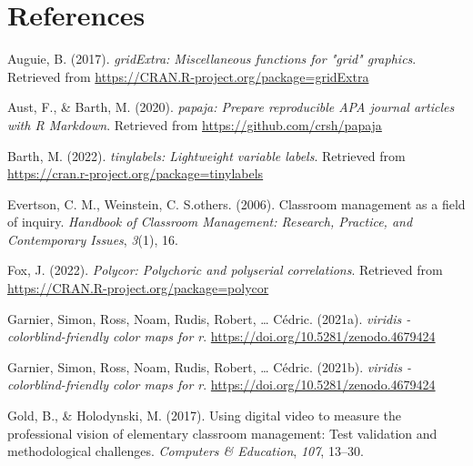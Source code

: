 \documentclass[
  man,floatsintext]{apa6}
\newlength{\cslhangindent}
\newlength{\cslentryspacingunit} %
\newenvironment{CSLReferences}[2] %
 {%
  \setlength{\parindent}{0pt}
  \ifodd #1
  \let\oldpar\par
  \def\par{\hangindent=\cslhangindent\oldpar}
  \fi
  \setlength{\parskip}{#2\cslentryspacingunit}
 }%
 {}
\begin{document}
\newpage

\hypertarget{references}{%
\section{References}\label{references}}

\begingroup
\setlength{\parindent}{-0.5in}
\setlength{\leftskip}{0.5in}

\hypertarget{refs}{}
\begin{CSLReferences}{1}{0}
\leavevmode{}%
Auguie, B. (2017). \emph{gridExtra: Miscellaneous functions for "grid" graphics}. Retrieved from \url{https://CRAN.R-project.org/package=gridExtra}

\leavevmode{}%
Aust, F., \& Barth, M. (2020). \emph{{papaja}: {Prepare} reproducible {APA} journal articles with {R Markdown}}. Retrieved from \url{https://github.com/crsh/papaja}

\leavevmode{}%
Barth, M. (2022). \emph{{tinylabels}: Lightweight variable labels}. Retrieved from \url{https://cran.r-project.org/package=tinylabels}

\leavevmode{}%
Evertson, C. M., Weinstein, C. S.others. (2006). Classroom management as a field of inquiry. \emph{Handbook of Classroom Management: Research, Practice, and Contemporary Issues}, \emph{3}(1), 16.

\leavevmode{}%
Fox, J. (2022). \emph{Polycor: Polychoric and polyserial correlations}. Retrieved from \url{https://CRAN.R-project.org/package=polycor}

\leavevmode{}%
Garnier, Simon, Ross, Noam, Rudis, Robert, \ldots{} Cédric. (2021a). \emph{{viridis} - colorblind-friendly color maps for r}. \url{https://doi.org/10.5281/zenodo.4679424}

\leavevmode{}%
Garnier, Simon, Ross, Noam, Rudis, Robert, \ldots{} Cédric. (2021b). \emph{{viridis} - colorblind-friendly color maps for r}. \url{https://doi.org/10.5281/zenodo.4679424}

\leavevmode{}%
Gold, B., \& Holodynski, M. (2017). Using digital video to measure the professional vision of elementary classroom management: Test validation and methodological challenges. \emph{Computers \& Education}, \emph{107}, 13--30.


\end{CSLReferences}
\end{document}

